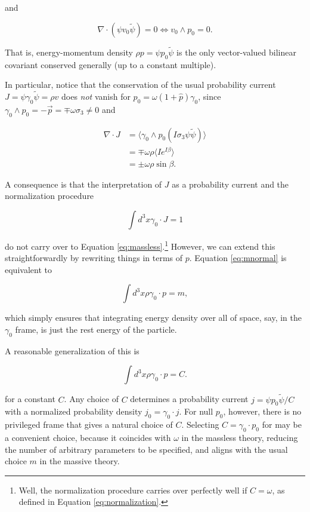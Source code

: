 \documentclass{article}
\begin{document}
  and

  \begin{equation}
    \nabla \cdot (\psi v_0 \widetilde \psi) = 0 \iff v_0 \wedge p_0 = 0. 
  \end{equation}

  That is, energy-momentum density $\rho p = \psi p_0 \widetilde \psi$ is the only vector-valued bilinear covariant conserved generally (up to a constant multiple).

  In particular, notice that the conservation of the usual probability current $J = \psi \gamma_0 \widetilde \psi = \rho v$ does \emph{not} vanish for $p_0 = \omega (1 + \hat p) \gamma_0$, since $\gamma_0 \wedge p_0 = - \vec p = \mp \omega \sigma_3 \not= 0$ and

  \begin{align}
    \nabla \cdot J &= \langle \gamma_0 \wedge p_0 (I \sigma_3 \psi \widetilde \psi) \rangle \\
                   &= \mp \omega \rho \langle I e^{I \beta} \rangle \\
                   &= \pm \omega \rho \sin \beta.
  \end{align}

  A consequence is that the interpretation of $J$ as a probability current and the normalization procedure

  \begin{equation}
    \int d^3x \gamma_0 \cdot J = 1\label{eq:mnormal}
  \end{equation}

  do not carry over to Equation \ref{eq:massless}.\footnote{Well, the normalization procedure carries over perfectly well if $C = \omega$, as defined in Equation \ref{eq:normalization}.} However, we can extend this straightforwardly by rewriting things in terms of $p$. Equation \ref{eq:mnormal} is equivalent to

  \begin{equation}
    \int d^3x \rho \gamma_0 \cdot p = m,
  \end{equation}

  which simply ensures that integrating energy density over all of space, say, in the $\gamma_0$ frame, is just the rest energy of the particle.

  A reasonable generalization of this is

  \begin{equation}
    \int d^3x \rho \gamma_0 \cdot p = C. \label{eq:normalization}
  \end{equation}

  for a constant $C$. Any choice of $C$ determines a probability current $j = \psi p_0 \widetilde \psi / C$ with a normalized probability density $j_0 = \gamma_0 \cdot j$. For null $p_0$, however, there is no privileged frame that gives a natural choice of $C$. Selecting $C = \gamma_0 \cdot p_0$ for may be a convenient choice, because it coincides with $\omega$ in the massless theory, reducing the number of arbitrary parameters to be specified, and aligns with the usual choice $m$ in the massive theory.
\end{document}
